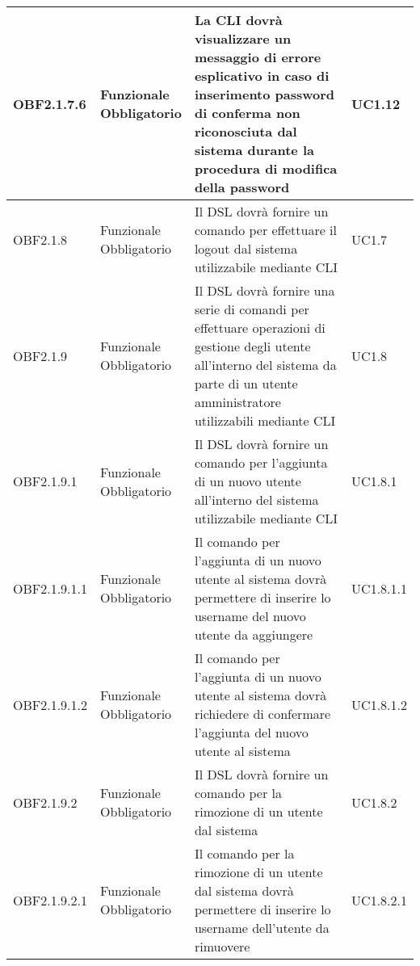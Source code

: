 \documentclass{scalatekids-article}
\begin{document}
\begin{longtable}[H]{|l|p{2cm}|p{6cm}|p{4cm}|}
\hline
OBF2.1.7.6 & \multiLineCell{Funzionale\\Obbligatorio} & La CLI dovrà visualizzare un messaggio di errore esplicativo in caso di inserimento password di conferma non riconosciuta dal sistema durante la procedura di modifica della password & \multiLineCell{UC1.12\\}\\
\hline
OBF2.1.8 & \multiLineCell{Funzionale\\Obbligatorio} & Il DSL dovrà fornire un comando per effettuare il logout dal sistema utilizzabile mediante CLI & \multiLineCell{UC1.7\\}\\
\hline
OBF2.1.9 & \multiLineCell{Funzionale\\Obbligatorio} & Il DSL dovrà fornire una serie di comandi per effettuare operazioni di gestione degli utente all'interno del sistema da parte di un utente amministratore utilizzabili mediante CLI & \multiLineCell{UC1.8\\}\\
\hline
OBF2.1.9.1 & \multiLineCell{Funzionale\\Obbligatorio} & Il DSL dovrà fornire un comando per l'aggiunta di un nuovo utente all'interno del sistema utilizzabile mediante CLI & \multiLineCell{UC1.8.1\\}\\
\hline
OBF2.1.9.1.1 & \multiLineCell{Funzionale\\Obbligatorio} & Il comando per l'aggiunta di un nuovo utente al sistema dovrà permettere di inserire lo username del nuovo utente da aggiungere & \multiLineCell{UC1.8.1.1\\}\\
\hline
OBF2.1.9.1.2 & \multiLineCell{Funzionale\\Obbligatorio} & Il comando per l'aggiunta di un nuovo utente al sistema dovrà richiedere di confermare l'aggiunta del nuovo utente al sistema & \multiLineCell{UC1.8.1.2\\}\\
\hline
OBF2.1.9.2 & \multiLineCell{Funzionale\\Obbligatorio} & Il DSL dovrà fornire un comando per la rimozione di un utente dal sistema & \multiLineCell{UC1.8.2\\}\\
\hline
OBF2.1.9.2.1 & \multiLineCell{Funzionale\\Obbligatorio} & Il comando per la rimozione di un utente dal sistema dovrà permettere di inserire lo username dell'utente da rimuovere & \multiLineCell{UC1.8.2.1\\}\\

\end{longtable}
\end{document}
